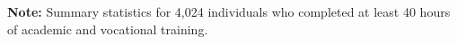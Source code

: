 \documentclass[lettersize, 12pt]{article}
\begin{document}
{\begin{table}
\begin{center}
\begin{tabular*}{\textwidth}{@{}lccccc@{}}
\hline
         \end{tabular*}
       \end{center}
       \footnotesize
       \renewcommand{\baselineskip}{11pt}
       \textbf{Note:} Summary statistics for 4,024 individuals who completed at least 40 hours of academic and vocational training.
       \end{table}
 




}
\end{document}
